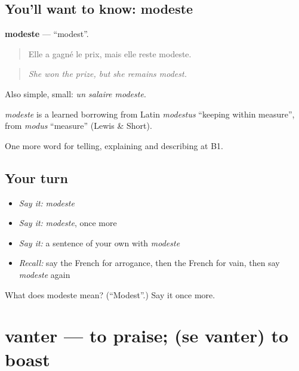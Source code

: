 \subsection*{You'll want to know: modeste}
\textbf{modeste} — \textquotedblleft{}modest\textquotedblright{}.

\begin{quote}
Elle a gagné le prix, mais elle reste modeste.
\end{quote}

\begin{quote}
\emph{She won the prize, but she remains modest.}
\end{quote}

Also simple, small: \emph{un salaire modeste}.

\begin{cousinweb}
\emph{modeste} is a learned borrowing from Latin \emph{modestus} \textquotedblleft{}keeping within measure\textquotedblright{}, from \emph{modus} \textquotedblleft{}measure\textquotedblright{} (Lewis \& Short).
\end{cousinweb}

\begin{grammarlens}[title={What you've built}]
One more word for telling, explaining and describing at B1.
\end{grammarlens}

\subsection*{Your turn}
\begin{itemize}
\raggedright
  \item \emph{Say it:} \emph{modeste}
  \item \emph{Say it:} \emph{modeste}, once more
  \item \emph{Say it:} a sentence of your own with \emph{modeste}
  \item \emph{Recall:} say the French for arrogance, then the French for vain, then say \emph{modeste} again
\end{itemize}

\begin{tcolorbox}[breakable,colback=teal!4,colframe=teal!35!black,title={Before you move on}]
What does modeste mean? (\textquotedblleft{}Modest\textquotedblright{}.) Say it once more.
\end{tcolorbox}
\section[vanter]{vanter — to praise; (se vanter) to boast}

